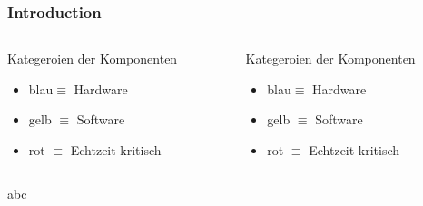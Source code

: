 \documentclass[xcolor=dvipsnames]{beamer}
\begin{document}
\begin{frame}
	\frametitle{Introduction}
	\begin{columns}
		\begin{column}{0.70\textwidth}
			\begin{block}{Kategeroien der Komponenten}
				\begin{itemize}
					\item blau$\equiv$ Hardware
					\item gelb $\equiv$ Software
					\item rot	$\equiv$ Echtzeit-kritisch
				\end{itemize}
			\end{block}
		\end{column}
	
		\begin{column}{0.30\textwidth}
			\begin{block}{Kategeroien der Komponenten}
				\begin{itemize}
					\item blau$\equiv$ Hardware
					\item gelb $\equiv$ Software
					\item rot	$\equiv$ Echtzeit-kritisch
				\end{itemize}
			\end{block}
		\end{column}
	\end{columns}



abc
\end{frame}
	
	
	
	
	
	
\end{document}
